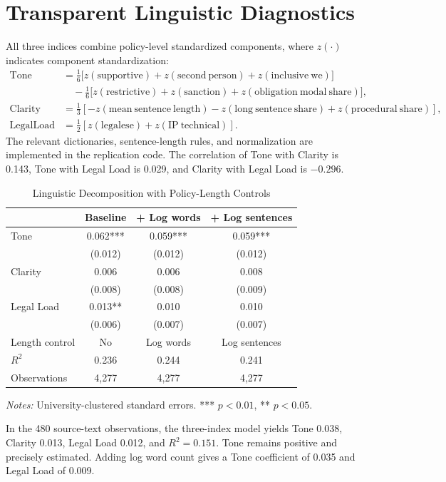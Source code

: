 \documentclass[11pt]{article}
\begin{document}
\section{Transparent Linguistic Diagnostics}
All three indices combine policy-level standardized components, where $z(\cdot)$ indicates component standardization:
\begin{align*}
\mathrm{Tone}&=\tfrac16\bigl[z(\mathrm{supportive})+z(\mathrm{second\ person})+z(\mathrm{inclusive\ we})\bigr]\\
&\quad-\tfrac16\bigl[z(\mathrm{restrictive})+z(\mathrm{sanction})+z(\mathrm{obligation\ modal\ share})\bigr],\\
\mathrm{Clarity}&=\tfrac13\left[-z(\mathrm{mean\ sentence\ length})-z(\mathrm{long\ sentence\ share})+z(\mathrm{procedural\ share})\right],\\
\mathrm{LegalLoad}&=\tfrac12\left[z(\mathrm{legalese})+z(\mathrm{IP\ technical})\right].
\end{align*}
The relevant dictionaries, sentence-length rules, and normalization are implemented in the replication code. The correlation of Tone with Clarity is 0.143, Tone with Legal Load is 0.029, and Clarity with Legal Load is $-0.296$.
\begin{table}[htbp]\centering\caption{Linguistic Decomposition with Policy-Length Controls}\small\begin{tabular}{lccc}\toprule &Baseline&+ Log words&+ Log sentences\\\midrule Tone&0.062***&0.059***&0.059***\\&(0.012)&(0.012)&(0.012)\\Clarity&0.006&0.006&0.008\\&(0.008)&(0.008)&(0.009)\\Legal Load&0.013**&0.010&0.010\\&(0.006)&(0.007)&(0.007)\\Length control&No&Log words&Log sentences\\$R^2$&0.236&0.244&0.241\\Observations&4,277&4,277&4,277\\\bottomrule\end{tabular}\par\small\emph{Notes:} University-clustered standard errors. *** $p<0.01$, ** $p<0.05$.\end{table}
In the 480 source-text observations, the three-index model yields Tone 0.038, Clarity 0.013, Legal Load 0.012, and $R^2=0.151$. Tone remains positive and precisely estimated. Adding log word count gives a Tone coefficient of 0.035 and Legal Load of 0.009.
\end{document}
